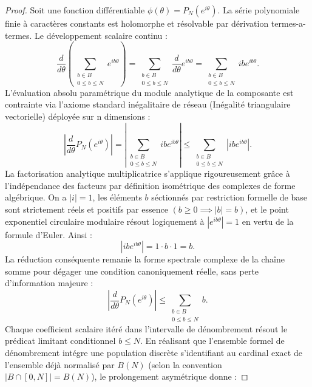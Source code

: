 \documentclass[12pt,a4paper]{article}
\begin{document}
\begin{proof}
Soit une fonction diff\'erentiable $\phi(\theta) = P_N(e^{i\theta})$. La s\'erie polynomiale finie \`a caract\`eres constants est holomorphe et r\'esolvable par d\'erivation termes-a-termes.
Le d\'eveloppement scalaire continu :
\begin{equation}
\frac{d}{d\theta} \left( \sum_{\substack{b \in B \\ 0 \le b \le N}} e^{ib\theta} \right) = \sum_{\substack{b \in B \\ 0 \le b \le N}} \frac{d}{d\theta} e^{ib\theta} = \sum_{\substack{b \in B \\ 0 \le b \le N}} ib e^{ib\theta}.
\end{equation}
L'\'evaluation absolu param\'etrique du module analytique de la composante est contrainte via l'axiome standard in\'egalitaire de r\'eseau (In\'egalit\'e triangulaire vectorielle) d\'eploy\'ee sur n dimensions :
\begin{equation}
\left| \frac{d}{d\theta} P_N(e^{i\theta}) \right| = \left| \sum_{\substack{b \in B \\ 0 \le b \le N}} ib e^{ib\theta} \right| \le \sum_{\substack{b \in B \\ 0 \le b \le N}} \left| ib e^{ib\theta} \right|.
\end{equation}
La factorisation analytique multiplicatrice s'applique rigoureusement gr\^ace \`a l'ind\'ependance des facteurs par d\'efinition isom\'etrique des complexes de forme alg\'ebrique. On a $|i| = 1$, les \'el\'ements $b$ s\'ectionn\'es par restriction formelle de base sont strictement r\'eels et positifs par essence $(b \ge 0 \implies |b|=b)$, et le point exponentiel circulaire modulaire r\'esout logiquement \`a $|e^{ib\theta}| = 1$ en vertu de la formule d'Euler. Ainsi :
\begin{equation}
| ib e^{ib\theta} | = 1 \cdot b \cdot 1 = b.
\end{equation}
La r\'eduction cons\'equente remanie la forme spectrale complexe de la cha\^ine somme pour d\'egager une condition canoniquement r\'eelle, sans perte d'information majeure :
\begin{equation}
\left| \frac{d}{d\theta} P_N(e^{i\theta}) \right| \le \sum_{\substack{b \in B \\ 0 \le b \le N}} b.
\end{equation}
Chaque coefficient scalaire it\'er\'e dans l'intervalle de d\'enombrement r\'esout le pr\'edicat limitant conditionnel $b \le N$. En r\'ealisant que l'ensemble formel de d\'enombrement int\'egre une population discr\`ete s'identifiant au cardinal exact de l'ensemble d\'ej\`a normalis\'e par $B(N)$ (selon la convention $|B \cap [0, N]| = B(N)$), le prolongement asym\'etrique donne :

\end{proof}
\end{document}
